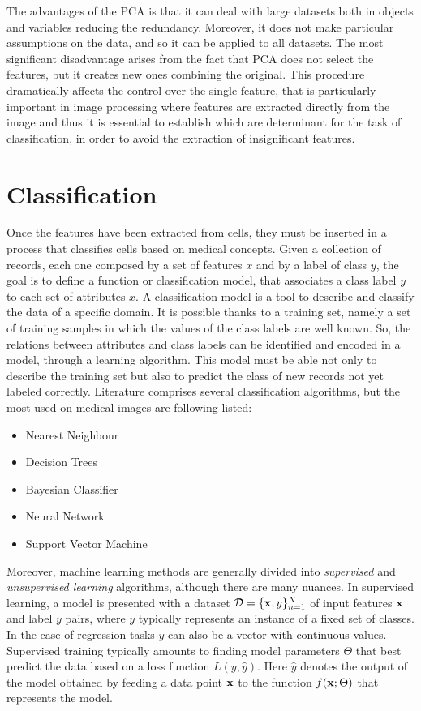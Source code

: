 The advantages of the PCA is that it can deal with large datasets both in objects and variables reducing the redundancy. Moreover, it does not make particular assumptions on the data, and so it can be applied to all datasets. The most significant disadvantage arises from the fact that PCA does not select the features, but it creates new ones combining the original. This procedure dramatically affects the control over the single feature, that is particularly important in image processing where features are extracted directly from the image and thus it is essential to establish which are determinant for the task of classification, in order to avoid the extraction of insignificant features.  

\chapter{Classification}
Once the features have been extracted from cells, they must be inserted in a process that classifies cells based on medical concepts. Given a collection of records, each one composed by a set of features $x$ and by a label of class $y$, the goal is to define a function or classification model, that associates a class label $y$ to each set of attributes $x$. A classification model is a tool to describe and classify the data of a specific domain. It is possible thanks to a training set, namely a set of training samples in which the values of the class labels are well known. So, the relations between attributes and class labels can be identified and encoded in a model, through a learning algorithm. This model must be able not only to describe the training set but also to predict the class of new records not yet labeled correctly. Literature comprises several classification algorithms, but the most used on medical images are following listed:
\begin{itemize}
	\item Nearest Neighbour
	\item Decision Trees
	\item Bayesian Classifier    
	\item Neural Network
	\item Support Vector Machine
\end{itemize}
Moreover, machine learning methods are generally divided into {\it supervised} and {\it unsupervised learning} algorithms, although there are many nuances. In supervised learning, a model is presented with a dataset $\mathcal{D} = \{{\bf x}, y\}^{N}_{n = 1}$ of input features ${\bf x}$ and label $y$ pairs, where $y$ typically represents an instance of a fixed set of classes. In the case of regression tasks $y$ can also be a vector with continuous values. Supervised training typically amounts to finding model parameters $\Theta$ that best predict the data based on a loss function $L(y, \hat{y})$. Here $\hat{y}$ denotes the output of the model obtained by feeding a data point ${\bf x}$ to the function $f({\bf x}; \Theta)$ that represents the model.
